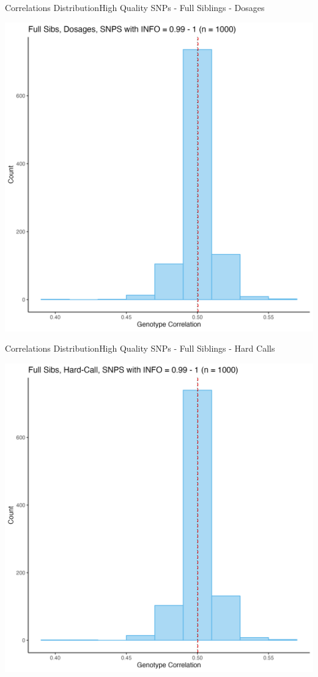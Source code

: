\documentclass{beamer}
\begin{document}

\begin{frame}{Correlations Distribution}{High Quality SNPs - Full Siblings - Dosages}

      \centering     
      \includegraphics[width= .7\textwidth]{fig/FS-DSG-i99.png}

\end{frame}


\begin{frame}{Correlations Distribution}{High Quality SNPs - Full Siblings - Hard Calls}

      \centering     
      \includegraphics[width= .7\textwidth]{fig/FS-HC-i99.png}
            
\end{frame}
\end{document}
